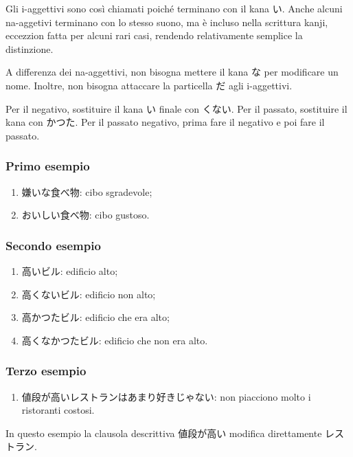 \documentclass{article}
\let\jap\textjapanese
\begin{document}
            Gli i-aggettivi sono così chiamati poiché terminano con il kana \jap{い}. Anche alcuni na-aggetivi terminano con lo
            stesso suono, ma è incluso nella scrittura kanji, eccezzion fatta per alcuni rari casi, rendendo relativamente
            semplice la distinzione.

            A differenza dei na-aggettivi, non bisogna mettere il kana \jap{な} per modificare un nome. Inoltre, non bisogna
            attaccare la particella \jap{だ} agli i-aggettivi.
            
            Per il negativo, sostituire il kana \jap{い} finale con \jap{くない}. Per il passato, sostituire il kana con
            \jap{かつた}. Per il passato negativo, prima fare il negativo e poi fare il passato.

            \subsubsection*{Primo esempio}

                \begin{enumerate}
                    \item \jap{嫌いな食べ物}: cibo sgradevole;
                    \item \jap{おいしい食べ物}: cibo gustoso.
                \end{enumerate}

            \subsubsection*{Secondo esempio}

                \begin{enumerate}
                    \item \jap{高いビル}: edificio alto;
                    \item \jap{高くないビル}: edificio non alto;
                    \item \jap{高かつたビル}: edificio che era alto;
                    \item \jap{高くなかつたビル}: edificio che non era alto.
                \end{enumerate}

            \subsubsection*{Terzo esempio}

                \begin{enumerate}
                    \item \jap{値段が高いレストランはあまり好きじゃない}: non piacciono molto i ristoranti costosi.
                \end{enumerate}

                In questo esempio la clausola descrittiva \jap{値段が高い} modifica direttamente \jap{レストラン}.
\end{document}
